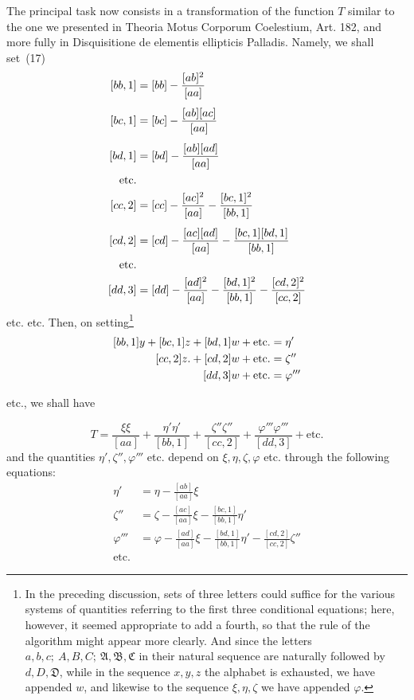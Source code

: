 The principal task now consists in a transformation of the function \(T\) similar to the one we presented in Theoria Motus Corporum Coelestium, Art. 182, and more fully in Disquisitione de elementis ellipticis Palladis. Namely, we shall set~(17)
\[
\begin{aligned}\relax
[bb,1]&=[bb]-\frac{[ab]^2}{[aa]}\\[4pt]
[bc,1]&=[bc]-\frac{[ab][ac]}{[aa]}\\[4pt]
[bd,1]&=[bd]-\frac{[ab][ad]}{[aa]}\\
\text{etc.}&\\
[cc,2]&=[cc]-\frac{[ac]^2}{[aa]}-\frac{[bc,1]^2}{[bb,1]}\\[4pt]
[cd,2]&=[cd]-\frac{[ac][ad]}{[aa]}-\frac{[bc,1][bd,1]}{[bb,1]}\\
\text{etc.}&\\
[dd,3]&=[dd]-\frac{[ad]^2}{[aa]}-\frac{[bd,1]^2}{[bb,1]}-\frac{[cd,2]^2}{[cc,2]}
\end{aligned}
\]
etc. etc. Then, on setting\footnote{In the preceding discussion, sets of three letters could suffice for the various systems of quantities referring to the first three conditional equations; here, however, it seemed appropriate to add a fourth, so that the rule of the algorithm might appear more clearly. And since the letters \(a,b,c;\ A,B,C;\ \mathfrak A,\mathfrak B,\mathfrak C\) in their natural sequence are naturally followed by \(d,D,\mathfrak D\), while in the sequence \(x,y,z\) the alphabet is exhausted, we have appended \(w\), and likewise to the sequence \(\xi,\eta,\zeta\) we have appended \(\varphi\).}
\[
\begin{aligned}\relax
[bb,1]y+[bc,1]z+[bd,1]w+\text{etc.}&=\eta'\\
[cc,2]z.+[cd,2]w+\text{etc.}&=\zeta''\\
[dd,3]w+\text{etc.}&=\varphi'''
\end{aligned}
\]
\begin{center}etc., we shall have\end{center}
\[
T=\frac{\xi\xi}{[aa]}+\frac{\eta'\eta'}{[bb,1]}+\frac{\zeta''\zeta''}{[cc,2]}+\frac{\varphi'''\varphi'''}{[dd,3]}+\text{etc.}
\]
and the quantities \(\eta',\zeta'',\varphi'''\) etc. depend on \(\xi,\eta,\zeta,\varphi\) etc. through the following equations:
\[
\begin{aligned}
\eta'&=\eta-\frac{[ab]}{[aa]}\xi\\[5pt]
\zeta''&=\zeta-\frac{[ac]}{[aa]}\xi-\frac{[bc,1]}{[bb,1]}\eta'\\[5pt]
\varphi'''&=\varphi-\frac{[ad]}{[aa]}\xi-\frac{[bd,1]}{[bb,1]}\eta'-\frac{[cd,2]}{[cc,2]}\zeta''\\
\text{etc.}&
\end{aligned}
\]

